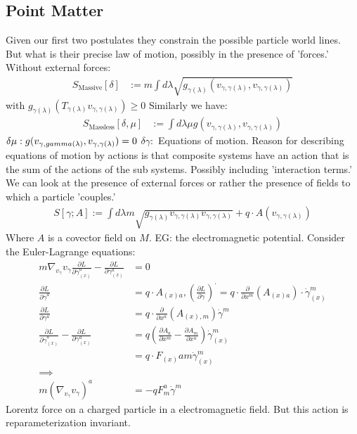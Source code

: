 \documentclass[10pt, oneside]{article}
\begin{document}
\subsection{Point Matter \cite{Matter}}
Given our first two postulates they constrain the possible particle world lines. But what is their precise law of motion, possibly in the presence of 'forces.'
Without external forces: 
\begin{align*}
   S_\text{Massive} [\delta] &:= m \int d \lambda \sqrt{g_{\gamma(\lambda)}(v_{\gamma, \gamma(\lambda)},v_{\gamma, \gamma(\lambda)})} 
\end{align*}
with $g_{\gamma(\lambda)}(T_{\gamma(\lambda)}v_{\gamma, \gamma(\lambda)}) \geq 0$ 
Similarly we have:
\begin{align*}
   S_\text{Massless} [\delta,\mu] & := \int d \lambda \mu g(v_{\gamma,\gamma(\lambda)},v_{\gamma,\gamma(\lambda)})
\end{align*}
$\delta \mu : g(v_{\gamma,gamma(\lambda)},v_{\gamma,\gamma(\lambda)}) = 0 \\$
$\delta \gamma: $ Equations of motion. 
Reason for describing equations of motion by actions is that composite systems have an action that is the sum of the actions of the sub systems. Possibly including 'interaction terms.'
We can look at the presence of external forces or rather the presence of fields to which a particle 'couples.'
\begin{align*}
   S[\gamma; A]:=\int d \lambda m \sqrt{g_{\gamma(\lambda)}v_{\gamma,\gamma(\lambda)}v_{\gamma, \gamma (\lambda)}}+q \cdot A(v_{\gamma,\gamma(\lambda)})
\end{align*}
Where $A$ is a covector field on $M$. EG: the electromagnetic potential. 
Consider the Euler-Lagrange equations:
\begin{align*}
m \nabla_{v_{\gamma}}v_{\gamma} \frac{\partial L}{\partial \dot{\gamma}^a_{(x)}}-\frac{\partial L}{\partial \gamma^a_{(x)}} &= 0 \\
\frac{\partial L}{\partial \dot{\gamma}^a} &= q \cdot A_{(x) a}, (\frac{\partial L}{\partial \dot{\gamma}})^\cdot = q \cdot \frac{\partial}{\partial x^m}(A_{(x) a}) \cdot \dot{\gamma}_{(x)}^m \\
\frac{\partial L}{\partial \gamma^a}&= q \cdot \frac{\partial}{\partial x^a}(A_{(x),m})\dot{\gamma}^m \\
\frac{\partial L}{\partial \dot{\gamma}^a_{(x)}}-\frac{\partial L}{\partial \gamma^a_{(x)}} &= q (\frac{\partial A_a}{\partial x^m}-\frac{\partial A_m}{\partial x^a}) \dot{\gamma}^m_{(x)} \\
&= q \cdot F_{(x)} am \dot{\gamma}^m_{(x)} \\
\implies \\
m (\nabla_{v_{\gamma}} v_\gamma)^a &= -q F^a_m \dot{\gamma}^m
\end{align*}
Lorentz force on a charged particle in a electromagnetic field. But this action is reparameterization invariant. 
\end{document}
